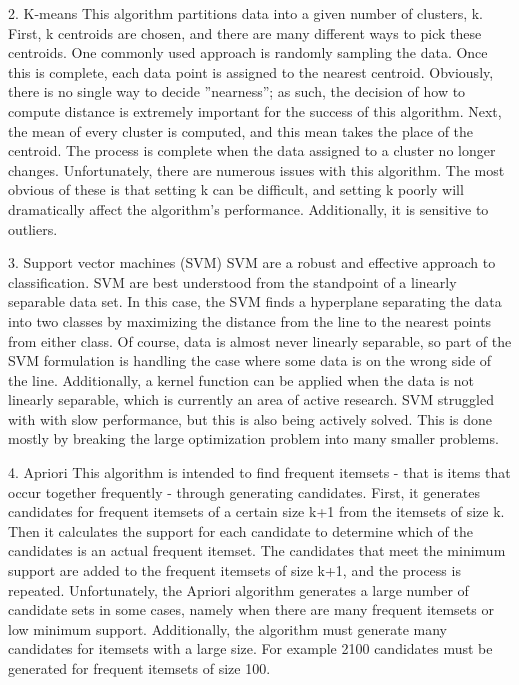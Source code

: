 2. K-means  This algorithm partitions data into a given number of clusters,
k. First, k centroids are chosen, and there are many different
ways to pick these centroids. One commonly used approach
is randomly sampling the data. Once this is complete, each
data point is assigned to the nearest centroid. Obviously, there
is no single way to decide ”nearness”; as such, the decision
of how to compute distance is extremely important for the
success of this algorithm. Next, the mean of every cluster
is computed, and this mean takes the place of the centroid.
The process is complete when the data assigned to a cluster
no longer changes. Unfortunately, there are numerous issues
with this algorithm. The most obvious of these is that setting
k can be difficult, and setting k poorly will dramatically affect
the algorithm’s performance. Additionally, it is sensitive to
outliers.

3. Support vector machines (SVM)  SVM are a robust and effective 
approach to classification.
SVM are best understood from the standpoint of a linearly
separable data set. In this case, the SVM finds a hyperplane
separating the data into two classes by maximizing the distance
from the line to the nearest points from either class. Of
course, data is almost never linearly separable, so part of the
SVM formulation is handling the case where some data is on
the wrong side of the line. Additionally, a kernel function
can be applied when the data is not linearly separable, which
is currently an area of active research. SVM struggled with
with slow performance, but this is also being actively solved.
This is done mostly by breaking the large optimization problem
into many smaller problems.

4. Apriori  This algorithm is intended to find frequent itemsets - that is
items that occur together frequently - through generating candidates.
First, it generates candidates for frequent itemsets of
a certain size k+1 from the itemsets of size k. Then it calculates
the support for each candidate to determine which of the
candidates is an actual frequent itemset. The candidates that
meet the minimum support are added to the frequent itemsets
of size k+1, and the process is repeated. Unfortunately, the
Apriori algorithm generates a large number of candidate sets
in some cases, namely when there are many frequent itemsets
or low minimum support. Additionally, the algorithm
must generate many candidates for itemsets with a large size.
For example 2100 candidates must be generated for frequent
itemsets of size 100.

